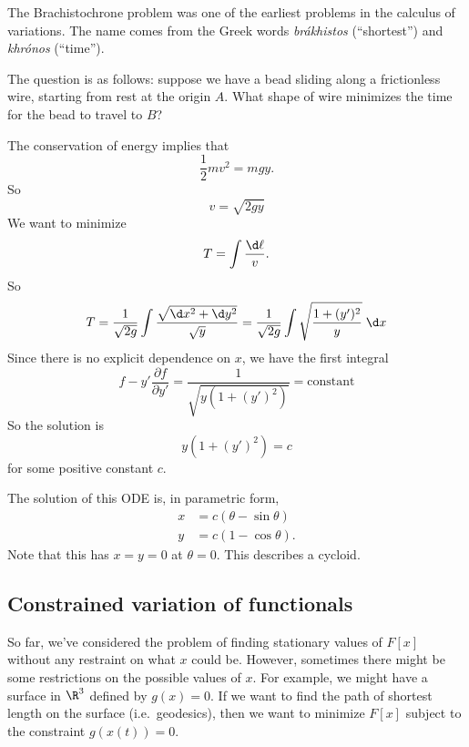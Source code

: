 \documentclass[a4paper]{article}
\begin{document}
\begin{eg}[Brachistochrone]
  The Brachistochrone problem was one of the earliest problems in the calculus of variations. The name comes from the Greek words \emph{br\'akhistos} (``shortest'') and \emph{khr\'onos} (``time'').

  The question is as follows: suppose we have a bead sliding along a frictionless wire, starting from rest at the origin $A$. What shape of wire minimizes the time for the bead to travel to $B$?
  \begin{center}
  \end{center}
  The conservation of energy implies that
  \[
    \frac{1}{2}mv^2 = mgy.
  \]
  So
  \[
    v = \sqrt{2gy}
  \]
  We want to minimize
  \[
    T = \int \frac{\d \ell}{v}.
  \]
  So
  \[
    T = \frac{1}{\sqrt{2g}}\int \frac{\sqrt{\d x^2 + \d y^2}}{\sqrt{y}} = \frac{1}{\sqrt{2g}}\int \sqrt{\frac{1 + (y')^2}{y}}\;\d x
  \]
  Since there is no explicit dependence on $x$, we have the first integral
  \[
    f - y'\frac{\partial f}{\partial y'} = \frac{1}{\sqrt{y(1 + (y')^2)}} = \text{constant}
  \]
  So the solution is
  \[
    y(1 + (y')^2) = c
  \]
  for some positive constant $c$.

  The solution of this ODE is, in parametric form,
  \begin{align*}
    x &= c(\theta - \sin \theta)\\
    y &= c(1 - \cos \theta).
  \end{align*}
  Note that this has $x = y = 0$ at $\theta = 0$. This describes a cycloid.
\end{eg}

\subsection{Constrained variation of functionals}
So far, we've considered the problem of finding stationary values of $F[x]$ without any restraint on what $x$ could be. However, sometimes there might be some restrictions on the possible values of $x$. For example, we might have a surface in $\R^3$ defined by $g(x) = 0$. If we want to find the path of shortest length on the surface (i.e.\ geodesics), then we want to minimize $F[x]$ subject to the constraint $g(x(t)) = 0$.
\end{document}
